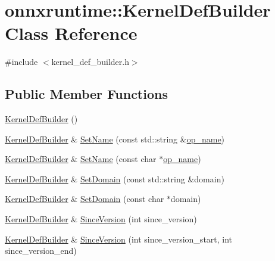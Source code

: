\hypertarget{classonnxruntime_1_1KernelDefBuilder}{}\section{onnxruntime\+:\+:Kernel\+Def\+Builder Class Reference}
\label{classonnxruntime_1_1KernelDefBuilder}


{\ttfamily \#include $<$kernel\+\_\+def\+\_\+builder.\+h$>$}

\subsection*{Public Member Functions}
\begin{DoxyCompactItemize}
\item 
\mbox{\hyperlink{classonnxruntime_1_1KernelDefBuilder_aaeaaa7326473772ed8fa6dac82c8a0c6}{Kernel\+Def\+Builder}} ()
\item 
\mbox{\hyperlink{classonnxruntime_1_1KernelDefBuilder}{Kernel\+Def\+Builder}} \& \mbox{\hyperlink{classonnxruntime_1_1KernelDefBuilder_ac4a02dfb347cfbb63a8e38f3f89d87ec}{Set\+Name}} (const std\+::string \&\mbox{\hyperlink{mkldnn_2nn_2pool_8cc_a3a7f1ca778ce6b4a22735e8b57736c04}{op\+\_\+name}})
\item 
\mbox{\hyperlink{classonnxruntime_1_1KernelDefBuilder}{Kernel\+Def\+Builder}} \& \mbox{\hyperlink{classonnxruntime_1_1KernelDefBuilder_ac403e40ce7b634b7237d714163f806a6}{Set\+Name}} (const char $\ast$\mbox{\hyperlink{mkldnn_2nn_2pool_8cc_a3a7f1ca778ce6b4a22735e8b57736c04}{op\+\_\+name}})
\item 
\mbox{\hyperlink{classonnxruntime_1_1KernelDefBuilder}{Kernel\+Def\+Builder}} \& \mbox{\hyperlink{classonnxruntime_1_1KernelDefBuilder_a57b4aa4ad328bbeb1b3a8d2e3a000c6d}{Set\+Domain}} (const std\+::string \&domain)
\item 
\mbox{\hyperlink{classonnxruntime_1_1KernelDefBuilder}{Kernel\+Def\+Builder}} \& \mbox{\hyperlink{classonnxruntime_1_1KernelDefBuilder_af6f1d5e60cf31aea85d834f4bb973ad5}{Set\+Domain}} (const char $\ast$domain)
\item 
\mbox{\hyperlink{classonnxruntime_1_1KernelDefBuilder}{Kernel\+Def\+Builder}} \& \mbox{\hyperlink{classonnxruntime_1_1KernelDefBuilder_ae0ddc824b271a1cb40f689f162049784}{Since\+Version}} (int since\+\_\+version)
\item 
\mbox{\hyperlink{classonnxruntime_1_1KernelDefBuilder}{Kernel\+Def\+Builder}} \& \mbox{\hyperlink{classonnxruntime_1_1KernelDefBuilder_a62f33b8471d08dd6d3c8acf086dc33a4}{Since\+Version}} (int since\+\_\+version\+\_\+start, int since\+\_\+version\+\_\+end)

\end{DoxyCompactItemize}

